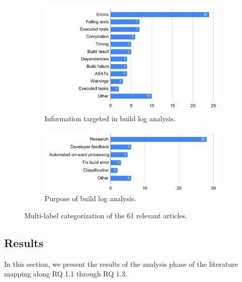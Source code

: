 \begin{figure}
\centering
\begin{subfigure}[t]{\columnwidth}
		\centering
		\includegraphics[width=\columnwidth,
		clip]{img/lit-sur/info_target.pdf}
		\caption{Information targeted in build log analysis.}
		\label{fig:litsur:info_target}

\end{subfigure}\hspace{\fill}
\begin{subfigure}[t]{\columnwidth}
		\centering
				\includegraphics[width=\columnwidth,
				clip]{img/lit-sur/use.pdf}
		\caption{Purpose of build log analysis.}
		\label{fig:litsur:use}

\end{subfigure}

\caption{Multi-label categorization of the 61 relevant articles.}
\end{figure}

\subsection{Results}
In this section, we present the results of the analysis phase of the
literature mapping along RQ 1.1 through RQ 1.3.

